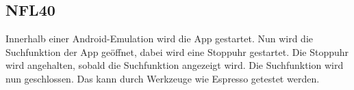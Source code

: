\subsection*{NFL40}

Innerhalb einer \Gls{Android}-\Gls{Emulation} wird die App gestartet.
Nun wird die Suchfunktion der App geöffnet, dabei wird eine Stoppuhr gestartet.
Die Stoppuhr wird angehalten, sobald die Suchfunktion angezeigt wird.
Die Suchfunktion wird nun geschlossen.
Das kann durch Werkzeuge wie \Gls{Espresso} getestet werden.